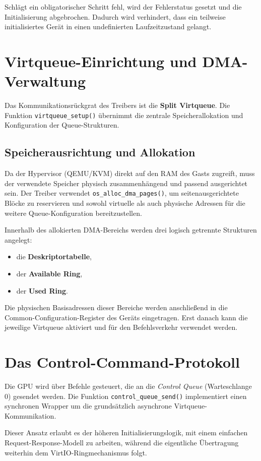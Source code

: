Schlägt ein obligatorischer Schritt fehl, wird der Fehlerstatus gesetzt und die
Initialisierung abgebrochen. Dadurch wird verhindert, dass ein teilweise
initialisiertes Gerät in einen undefinierten Laufzeitzustand gelangt.

\section{Virtqueue-Einrichtung und DMA-Verwaltung}
Das Kommunikationsrückgrat des Treibers ist die \textbf{Split Virtqueue}. Die
Funktion \texttt{virtqueue\_setup()} übernimmt die zentrale Speicherallokation
und Konfiguration der Queue-Strukturen.

\subsection{Speicherausrichtung und Allokation}
Da der Hypervisor (QEMU/KVM) direkt auf den RAM des Gasts zugreift, muss der
verwendete Speicher physisch zusammenhängend und passend ausgerichtet sein. Der
Treiber verwendet \texttt{os\_alloc\_dma\_pages()}, um seitenausgerichtete
Blöcke zu reservieren und sowohl virtuelle als auch physische Adressen für die
weitere Queue-Konfiguration bereitzustellen.

Innerhalb des allokierten DMA-Bereichs werden drei logisch getrennte Strukturen
angelegt:
\begin{itemize}
    \item die \textbf{Deskriptortabelle},
    \item der \textbf{Available Ring},
    \item der \textbf{Used Ring}.
\end{itemize}

Die physischen Basisadressen dieser Bereiche werden anschließend in die
Common-Configuration-Register des Geräts eingetragen. Erst danach kann die
jeweilige Virtqueue aktiviert und für den Befehlsverkehr verwendet werden.

\section{Das Control-Command-Protokoll}
Die GPU wird über Befehle gesteuert, die an die \textit{Control Queue}
(Warteschlange 0) gesendet werden. Die Funktion
\texttt{control\_queue\_send()} implementiert einen synchronen Wrapper um die
grundsätzlich asynchrone Virtqueue-Kommunikation.

Dieser Ansatz erlaubt es der höheren Initialisierungslogik, mit einem einfachen
Request-Response-Modell zu arbeiten, während die eigentliche Übertragung
weiterhin dem VirtIO-Ringmechanismus folgt.

